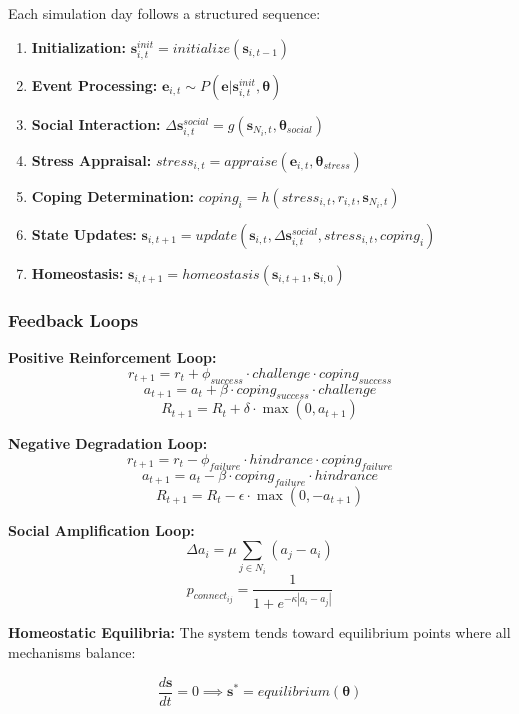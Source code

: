 \documentclass[
  letterpaper,
  DIV=11,
  numbers=noendperiod]{scrartcl}
\providecommand{\tightlist}{%
  \setlength{\itemsep}{0pt}\setlength{\parskip}{0pt}}
\begin{document}
Each simulation day follows a structured sequence:

\begin{enumerate}
\def\labelenumi{\arabic{enumi}.}
\tightlist
\item
  \textbf{Initialization:}
  \(\mathbf{s}_{i,t}^{init} = initialize(\mathbf{s}_{i,t-1})\)
\item
  \textbf{Event Processing:}
  \(\mathbf{e}_{i,t} \sim P(\mathbf{e}|\mathbf{s}_{i,t}^{init}, \mathbf{\theta})\)
\item
  \textbf{Social Interaction:}
  \(\Delta \mathbf{s}_{i,t}^{social} = g(\mathbf{s}_{N_i,t}, \mathbf{\theta}_{social})\)
\item
  \textbf{Stress Appraisal:}
  \(stress_{i,t} = appraise(\mathbf{e}_{i,t}, \mathbf{\theta}_{stress})\)
\item
  \textbf{Coping Determination:}
  \(coping_i = h(stress_{i,t}, r_{i,t}, \mathbf{s}_{N_i,t})\)
\item
  \textbf{State Updates:}
  \(\mathbf{s}_{i,t+1} = update(\mathbf{s}_{i,t}, \Delta \mathbf{s}_{i,t}^{social}, stress_{i,t}, coping_i)\)
\item
  \textbf{Homeostasis:}
  \(\mathbf{s}_{i,t+1} = homeostasis(\mathbf{s}_{i,t+1}, \mathbf{s}_{i,0})\)
\end{enumerate}

\subsubsection{Feedback Loops}\label{feedback-loops}

\textbf{Positive Reinforcement Loop:}
\[r_{t+1} = r_t + \phi_{success} \cdot challenge \cdot coping_{success}\]
\[a_{t+1} = a_t + \beta \cdot coping_{success} \cdot challenge\]
\[R_{t+1} = R_t + \delta \cdot \max(0, a_{t+1})\]

\textbf{Negative Degradation Loop:}
\[r_{t+1} = r_t - \phi_{failure} \cdot hindrance \cdot coping_{failure}\]
\[a_{t+1} = a_t - \beta \cdot coping_{failure} \cdot hindrance\]
\[R_{t+1} = R_t - \epsilon \cdot \max(0, -a_{t+1})\]

\textbf{Social Amplification Loop:}
\[\Delta a_i = \mu \sum_{j \in N_i} (a_j - a_i)\]
\[p_{connect_{ij}} = \frac{1}{1 + e^{-\kappa |a_i - a_j|}}\]

\textbf{Homeostatic Equilibria:} The system tends toward equilibrium
points where all mechanisms balance:

\[\frac{d\mathbf{s}}{dt} = 0 \implies \mathbf{s}^* = equilibrium(\mathbf{\theta})\]
\end{document}

